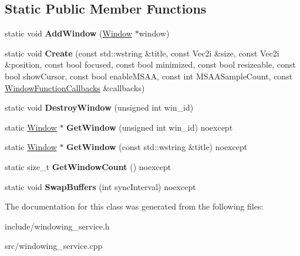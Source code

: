 \subsection*{Static Public Member Functions}
\begin{DoxyCompactItemize}
\item 
\mbox{\label{class_blade_1_1_windowing_service_a0aebfbe56c654a96c59673dce01ef0bd}} 
static void {\bfseries Add\+Window} (\hyperlink{class_blade_1_1_window}{Window} $\ast$window)
\item 
\mbox{\label{class_blade_1_1_windowing_service_a5b4f744bc32f511819ac2e619f1f44b6}} 
static void {\bfseries Create} (const std\+::wstring \&title, const Vec2i \&size, const Vec2i \&position, const bool focused, const bool minimized, const bool resizeable, const bool show\+Cursor, const bool enable\+M\+S\+AA, const int M\+S\+A\+A\+Sample\+Count, const \hyperlink{struct_blade_1_1_window_function_callbacks}{Window\+Function\+Callbacks} \&callbacks)
\item 
\mbox{\label{class_blade_1_1_windowing_service_aed58ecc984625483ab4689f8f3cbc66d}} 
static void {\bfseries Destroy\+Window} (unsigned int win\+\_\+id)
\item 
\mbox{\label{class_blade_1_1_windowing_service_ac989c0b2fe33243c693f754dd29bfa90}} 
static \hyperlink{class_blade_1_1_window}{Window} $\ast$ {\bfseries Get\+Window} (unsigned int win\+\_\+id) noexcept
\item 
\mbox{\label{class_blade_1_1_windowing_service_ae8df3158d80f6a637288c9c33bd07082}} 
static \hyperlink{class_blade_1_1_window}{Window} $\ast$ {\bfseries Get\+Window} (const std\+::wstring \&title) noexcept
\item 
\mbox{\label{class_blade_1_1_windowing_service_ae4efa373fd41150f975bed1d20a6996b}} 
static size\+\_\+t {\bfseries Get\+Window\+Count} () noexcept
\item 
\mbox{\label{class_blade_1_1_windowing_service_aa56c7383e513d9269d697e18742e687f}} 
static void {\bfseries Swap\+Buffers} (int sync\+Interval) noexcept
\end{DoxyCompactItemize}


The documentation for this class was generated from the following files\+:\begin{DoxyCompactItemize}
\item 
include/windowing\+\_\+service.\+h\item 
src/windowing\+\_\+service.\+cpp\end{DoxyCompactItemize}
